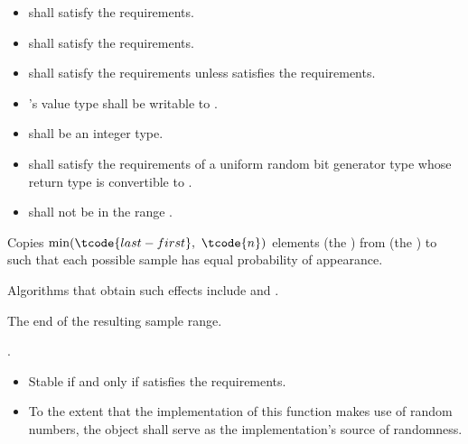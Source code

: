 \begin{itemdescr}
\pnum
\requires
\begin{itemize}
\item
   shall satisfy
  the  requirements.
\item
   shall satisfy
  the  requirements.
\item
   shall satisfy
  the  requirements
  unless  satisfies
  the  requirements.
\item
  's value type shall be
  writable to .
\item
   shall be an integer type.
\item
   shall satisfy
  the requirements of a uniform random bit generator type
  whose return type is convertible to .
\item
   shall not be in the range .
\end{itemize}

\pnum
\effects
Copies $\min(\tcode{last - first}, \ \tcode{n})$ elements (the )
from  (the ) to 
such that each possible sample has equal probability of appearance.
\begin{note}
Algorithms that obtain such effects include 
and .
\end{note}

\pnum
\returns
The end of the resulting sample range.

\pnum
\complexity
{}.

\pnum
\remarks
\begin{itemize}
\item
  Stable if and only if  satisfies
  the  requirements.
\item
  To the extent that the implementation of this function makes use
  of random numbers, the object  shall serve as
  the implementation's source of randomness.
\end{itemize}
\end{itemdescr}

